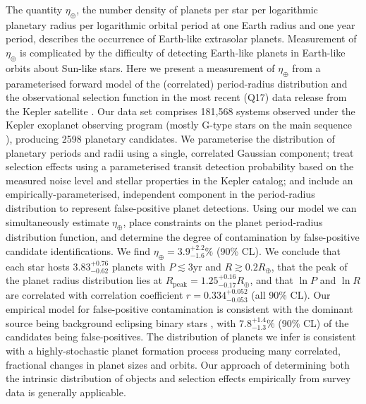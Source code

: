 \documentclass[apjl]{emulateapj}
\newcommand{\etaearth}{\eta_\oplus}
\newcommand{\Rpeak}{R_\mathrm{peak}}
\newcommand{\REarth}{R_\oplus}
\newcommand{\earange}{3.9_{-1.6}^{+2.2}\%}
\newcommand{\rplrange}{3.83_{-0.62}^{+0.76}}
\newcommand{\rpeakrange}{1.25_{-0.17}^{+0.16}}
\newcommand{\corrcoeffrange}{0.334_{-0.053}^{+0.052}}
\newcommand{\fposrange}{7.8_{-1.3}^{+1.4}\%}
\begin{document}
The quantity $\etaearth$, the number density of planets per star per
logarithmic planetary radius per logarithmic orbital period at one
Earth radius and one year period, describes the occurrence of
Earth-like extrasolar planets.  Measurement of $\etaearth$ is
complicated by the difficulty of detecting Earth-like planets in
Earth-like orbits about Sun-like stars.  Here we present a measurement
of $\etaearth$ from a parameterised forward model of the (correlated)
period-radius distribution and the observational selection function in
the most recent (Q17) data release from the Kepler satellite
\citep{Borucki2010,Borucki2011,Batalha2013}.  Our data set comprises
181,568 systems observed under the Kepler exoplanet observing program
(mostly G-type stars on the main sequence \citep{Batalha2010}),
producing 2598 planetary candidates.  We parameterise the distribution
of planetary periods and radii using a single, correlated Gaussian
component; treat selection effects using a parameterised transit
detection probability based on the measured noise level and stellar
properties in the Kepler catalog; and include an
empirically-parameterised, independent component in the period-radius
distribution to represent false-positive planet detections.  Using our
model we can simultaneously estimate $\etaearth$, place constraints on
the planet period-radius distribution function, and determine the
degree of contamination by false-positive candidate identifications.
We find $\etaearth = \earange$ (90\% CL).  We conclude that each star
hosts $\rplrange$ planets with $P \lesssim 3 \mathrm{yr}$ and $R
\gtrsim 0.2 \REarth$, that the peak of the planet radius distribution
lies at $\Rpeak = \rpeakrange \REarth$, and that $\ln P$ and $\ln R$
are correlated with correlation coefficient $r = \corrcoeffrange$ (all
90\% CL).  Our empirical model for false-positive contamination is
consistent with the dominant source being background eclipsing binary
stars \citep{Fressin2013}, with $\fposrange$ (90\% CL) of the
candidates being false-positives.  The distribution of planets we
infer is consistent with a highly-stochastic planet formation process
producing many correlated, fractional changes in planet sizes and
orbits.  Our approach of determining both the intrinsic distribution
of objects and selection effects empirically from survey data is
generally applicable.
\end{document}
